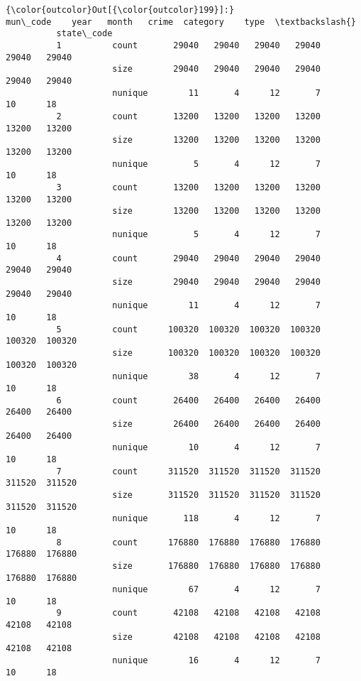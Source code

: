 \documentclass[11pt]{article}
\begin{document}
\begin{Verbatim}[commandchars=\\\{\}]
{\color{outcolor}Out[{\color{outcolor}199}]:}                     mun\_code    year   month   crime  category    type  \textbackslash{}
          state\_code                                                               
          1          count       29040   29040   29040   29040     29040   29040   
                     size        29040   29040   29040   29040     29040   29040   
                     nunique        11       4      12       7        10      18   
          2          count       13200   13200   13200   13200     13200   13200   
                     size        13200   13200   13200   13200     13200   13200   
                     nunique         5       4      12       7        10      18   
          3          count       13200   13200   13200   13200     13200   13200   
                     size        13200   13200   13200   13200     13200   13200   
                     nunique         5       4      12       7        10      18   
          4          count       29040   29040   29040   29040     29040   29040   
                     size        29040   29040   29040   29040     29040   29040   
                     nunique        11       4      12       7        10      18   
          5          count      100320  100320  100320  100320    100320  100320   
                     size       100320  100320  100320  100320    100320  100320   
                     nunique        38       4      12       7        10      18   
          6          count       26400   26400   26400   26400     26400   26400   
                     size        26400   26400   26400   26400     26400   26400   
                     nunique        10       4      12       7        10      18   
          7          count      311520  311520  311520  311520    311520  311520   
                     size       311520  311520  311520  311520    311520  311520   
                     nunique       118       4      12       7        10      18   
          8          count      176880  176880  176880  176880    176880  176880   
                     size       176880  176880  176880  176880    176880  176880   
                     nunique        67       4      12       7        10      18   
          9          count       42108   42108   42108   42108     42108   42108   
                     size        42108   42108   42108   42108     42108   42108   
                     nunique        16       4      12       7        10      18   

\end{Verbatim}
\end{document}
